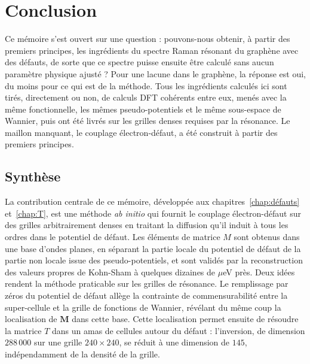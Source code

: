\chapter{Conclusion}\label{chap:conclusion}

Ce mémoire s'est ouvert sur une question : pouvons-nous obtenir, à partir des premiers principes, les ingrédients du spectre Raman résonant du graphène avec des défauts, de sorte que ce spectre puisse ensuite être calculé sans aucun paramètre physique ajusté ? Pour une lacune dans le graphène, la réponse est oui, du moins pour ce qui est de la méthode. Tous les ingrédients calculés ici sont tirés, directement ou non, de calculs DFT cohérents entre eux, menés avec la même fonctionnelle, les mêmes pseudo-potentiels et le même sous-espace de Wannier, puis ont été livrés sur les grilles denses requises par la résonance. Le maillon manquant, le couplage électron-défaut, a été construit à partir des premiers principes.

\section{Synthèse}

La contribution centrale de ce mémoire, développée aux chapitres~\ref{chap:défauts} et~\ref{chap:T}, est une méthode \textit{ab initio} qui fournit le couplage électron-défaut sur des grilles arbitrairement denses en traitant la diffusion qu'il induit à tous les ordres dans le potentiel de défaut. Les éléments de matrice $M$ sont obtenus dans une base d'ondes planes, en séparant la partie locale du potentiel de défaut de la partie non locale issue des pseudo-potentiels, et sont validés par la reconstruction des valeurs propres de Kohn-Sham à quelques dizaines de $\mu$eV près. Deux idées rendent la méthode praticable sur les grilles de résonance. Le remplissage par zéros du potentiel de défaut allège la contrainte de commensurabilité entre la super-cellule et la grille de fonctions de Wannier, révélant du même coup la localisation de $\bm M$ dans cette base. Cette localisation permet ensuite de résoudre la matrice $T$ dans un amas de cellules autour du défaut : l'inversion, de dimension $288\,000$ sur une grille $240\times 240$, se réduit à une dimension de $145$, indépendamment de la densité de la grille.

